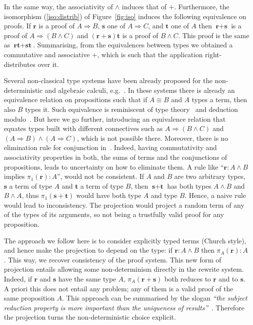 \documentclass[final,copyright,creativecommons]{eptcs}
\newcommand{\ve}[1]{\ensuremath{\mathrm{\textbf{#1}}}}
\theoremstyle{definition}
\begin{document}
In the same way, the associativity of $\wedge$ induces that of $+$.
Furthermore, the isomorphism (\ref{iso:distrib}) of Figure~\ref{fig:iso} induces the following equivalence on proofs. If $\ve r$ is a proof of $A \Rightarrow B$, $\ve s$ one of $A \Rightarrow C$, and $\ve t$ one of $A$ then $\ve r + \ve s$ is a proof of $A \Rightarrow (B \wedge C)$ and $(\ve r + \ve s)\ve t$ is a proof of $B \wedge C$. This proof is the same as $\ve r\ve t + \ve s\ve t$.
Summarising, from the equivalences between types we obtained a commutative and associative $+$, which is such that the application right-distributes over it.

Several non-classical type systems have been already proposed for the non-deterministic and algebraic calculi, e.g.~\cite{ArrighiDiazcaroLMCS12,ArrighiDiazcaroValironDCM11,DiazcaroPetitWoLLIC12}. In these systems there is already an equivalence relation on propositions such that if $A\equiv B$ and $A$ types a term, then also $B$ types it. Such equivalence is reminiscent of type theory~\cite{CoquandHuetIC88,MartinLof84} and deduction modulo~\cite{DowekHardinKirchnerJAR03,DowekWernerJSL98}. But here we go further, introducing an equivalence relation that equates types built with different connectives such as $A\Rightarrow(B\wedge C)$ and $(A\Rightarrow B)\wedge(A\Rightarrow C)$, which is not possible there.
Moreover, there is no elimination rule for conjunction in~\cite{ArrighiDiazcaroLMCS12,ArrighiDiazcaroValironDCM11,DiazcaroPetitWoLLIC12}. Indeed, having commutativity and associativity properties in both, the sums of terms and the conjunctions of propositions, leads to uncertainty on how to eliminate them. A rule like
``$\ve r:A\wedge B$ implies $ \pi_1(\ve r):A$'',
would not be consistent.
If $A$ and $B$ are two arbitrary types, $\ve s$ a term of type $A$ and $\ve t$ a term of type $B$, then $\ve s+\ve t$ has both types $A\wedge B$ and $B \wedge A$, thus $\pi_1(\ve s +\ve t)$ would have both type $A$ and type $B$.
Hence, a naive rule would lead to inconsistency. The projection would project a random term of any of the types of its arguments, so not being a trustfully valid proof for any proposition.

The approach we follow here is to consider explicitly typed terms (Church style), and hence make the projection to depend on the type:
if $\ve r:A\wedge B$ then $\pi_A(\ve r):A$.
This way, we recover consistency of the proof system. This new form of projection entails allowing some non-determinism directly in the rewrite system. Indeed, if $\ve r$ and $\ve s$ have the same type $A$,
$\pi_A(\ve r +\ve s)$ both reduces to $\ve r$ and to $\ve s$.
A priori this does not entail any problem; any of them is a valid proof of the same proposition $A$. This approach can be summarised by the slogan {\em ``the subject reduction property is more important than the uniqueness of results''}~\cite{DowekJiangIC11}. Therefore the projection turns the non-deterministic choice explicit.
\end{document}
